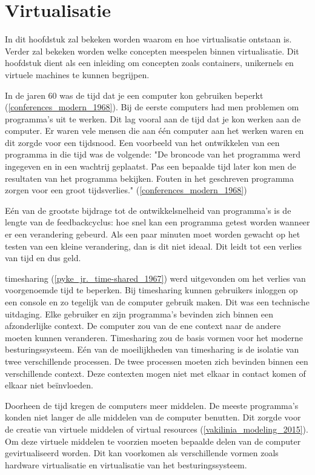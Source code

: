 \documentclass[pdftex,a4paper,12pt,twoside]{report}
\begin{document}
\chapter{Virtualisatie}
\label{ch:virtualisatie}

In dit hoofdstuk zal bekeken worden waarom en hoe virtualisatie ontstaan is. Verder zal bekeken worden welke concepten meespelen binnen virtualisatie. Dit hoofdstuk dient als een inleiding om concepten zoals containers, unikernels en virtuele machines te kunnen begrijpen.

In de jaren 60 was de tijd dat je een computer kon gebruiken beperkt (\ref{conferences_modern_1968}).  Bij de eerste computers had men problemen om programma's uit te werken. Dit lag vooral aan de tijd dat je kon werken aan de computer. Er waren vele mensen die aan één computer aan het werken waren en dit zorgde voor een tijdsnood. Een voorbeeld van het ontwikkelen van een programma in die tijd was de volgende: "De broncode van het programma werd ingegeven en in een wachtrij geplaatst. Pas een bepaalde tijd later kon men de resultaten van het programma bekijken. Fouten in het geschreven programma zorgen voor een groot tijdsverlies." (\ref{conferences_modern_1968})

Eén van de grootste bijdrage tot de ontwikkelsnelheid van programma's is de lengte van de feedbackcyclus: hoe snel kan een programma getest worden wanneer er een verandering gebeurd. Als een paar minuten moet worden gewacht op het testen van een kleine verandering, dan is dit niet ideaal. Dit leidt tot een verlies van tijd en dus geld.

timesharing (\ref{pyke_jr._time-shared_1967}) werd uitgevonden om het verlies van voorgenoemde tijd te beperken. Bij timesharing kunnen gebruikers inloggen op een console en zo tegelijk van de computer gebruik maken. Dit was een technische uitdaging. Elke gebruiker en zijn programma's bevinden zich binnen een afzonderlijke context. De computer zou van de ene context naar de andere moeten kunnen veranderen. Timesharing zou de basis vormen voor het moderne besturingssysteem. Eén van de moeilijkheden van timesharing is de isolatie van twee verschillende processen. De twee processen moeten zich bevinden binnen een verschillende context. Deze contexten mogen niet met elkaar in contact komen of elkaar niet beïnvloeden.

Doorheen de tijd kregen de computers meer middelen. De meeste programma's konden niet langer de alle middelen van de computer benutten. Dit zorgde voor de creatie van virtuele middelen of virtual resources (\ref{vakilinia_modeling_2015}). Om deze virtuele middelen te voorzien moeten bepaalde delen van de computer gevirtualiseerd worden. Dit kan voorkomen als verschillende vormen zoals hardware virtualisatie en virtualisatie van het besturingssysteem.
\end{document}

